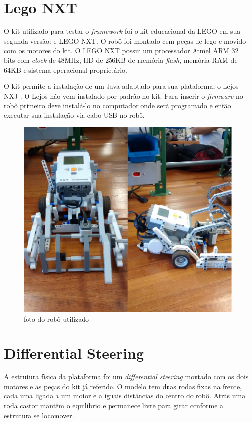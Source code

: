 \section{Lego NXT}

O kit utilizado para testar o \textit{framework} foi o kit educacional da LEGO em sua segunda versão: o LEGO NXT. O robô foi montado com peças de lego e movido com os motores do kit. O LEGO NXT possui um processador Atmel ARM 32 bits com \textit{clock} de 48MHz, HD de 256KB de memória \textit{flash}, memória RAM de 64KB e sistema operacional proprietário.

O kit permite a instalação de um Java adaptado para sua plataforma, o Lejos NXJ \cite{LEJOS_SITE}. O Lejos não vem instalado por padrão no kit. Para inserir o \textit{firmware} no robô primeiro deve instalá-lo no computador onde será programado e então executar sua instalação via cabo USB no robô.

\begin{figure}[h]
	\centering
	\label{fig17}
		\includegraphics[keepaspectratio=true,scale=0.2]{figuras/5nxtBrick.png}
	\caption{foto do robô utilizado}
\end{figure}

\section{Differential Steering}

A estrutura física da plataforma foi um \textit{differential steering} montado com os dois motores e as peças do kit já referido. O modelo tem duas rodas fixas na frente, cada uma ligada a um motor e a iguais distâncias do centro do robô. Atrás uma roda castor mantêm o equilíbrio e permanece livre para girar conforme a estrutura se locomover.

